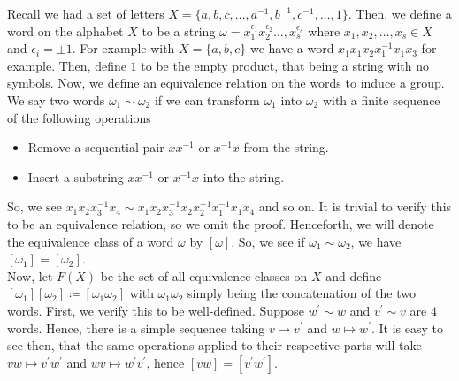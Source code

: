 Recall we had a set of letters \(X = \{a, b, c, \ldots, a^{-1}, b^{-1}, c^{-1}, \ldots,  1 \}\). Then, we define a word on the alphabet \(X\) to be a string \(\omega = x_1^{\epsilon_1} x_2^{\epsilon_2} \ldots, x_{s}^{\epsilon_{s}}\) where \(x_1, x_2, \ldots, x_{s} \in X\) and \(\epsilon _{i} = \pm 1\). For example with \(X = \{a, b, c\} \) we have a word \(x_1 x_1 x_2 x_1^{-1} x_1 x_3\) for example. Then, define \(1\) to be the empty product, that being a string with no symbols. Now, we define an equivalence relation on the words to induce a group.\\
We say two words \(\omega_1 \sim \omega_2\) if we can transform \(\omega_1\) into \(\omega_2\) with a finite sequence of the following operations
\begin{itemize}
	\item Remove a sequential pair \(x x^{-1}\) or \(x^{-1} x\) from the string.
	\item Insert a substring \(x x^{-1}\) or \(x^{-1} x\) into the string.
\end{itemize}
So, we see \(x_1x_2x_3^{-1}x_4 \sim x_1x_2x_3^{-1}x_2x_2^{-1} x_1^{-1} x_1 x_4\) and so on. It is trivial to verify this to be an equivalence relation, so we omit the proof. Henceforth, we will denote the equivalence class of a word \(\omega\) by \(\left[ \omega \right] \). So, we see if \( \omega_1 \sim \omega_2\), we have \(\left[ \omega_1 \right]  = \left[ \omega_2 \right] \).\\
Now, let \(F\left( X \right) \) be the set of all equivalence classes on \(X\) and define \(\left[ \omega_1 \right] \left[ \omega_2 \right]  \coloneqq \left[ \omega_1\omega_2 \right]  \) with \(\omega_1 \omega_2\) simply being the concatenation of the two words. First, we verify this to be well-defined. Suppose \(w^{\prime} \sim w\) and \(v^{\prime} \sim v\) are \(4\) words. Hence, there is a simple sequence taking \(v \mapsto v^{\prime}\) and \(w \mapsto w^{\prime}\). It is easy to see then, that the same operations applied to their respective parts will take \(vw \mapsto v^{\prime} w^{\prime}\) and \(wv \mapsto w^{\prime} v^{\prime}\), hence \(\left[ vw \right]  = \left[ v^{\prime} w^{\prime} \right] \).
